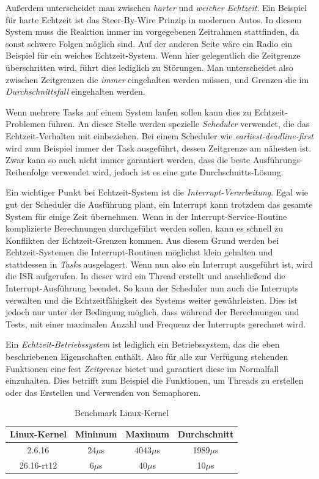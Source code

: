 \documentclass[
  a4paper,					%
  twoside,
  DIV=calc,     				%
  bibliography=totoc,
  cleardoublepage=empty,
  ngerman,     					%
  final       					%
]{scrbook}
\begin{document}
Außerdem unterscheidet man zwischen \emph{harter} und \emph{weicher Echtzeit}. Ein Beispiel für harte Echtzeit ist das Steer-By-Wire Prinzip in modernen Autos. In diesem System muss die Reaktion immer im vorgegebenen Zeitrahmen stattfinden, da sonst schwere Folgen möglich sind. Auf der anderen Seite wäre ein Radio ein Beispiel für ein weiches Echtzeit-System. Wenn hier gelegentlich die Zeitgrenze überschritten wird, führt dies lediglich zu Störungen. Man unterscheidet also zwischen Zeitgrenzen die \emph{immer} eingehalten werden müssen, und Grenzen die im \emph{Durchschnittsfall} eingehalten werden.

Wenn mehrere Tasks auf einem System laufen sollen kann dies zu Echtzeit-Problemen führen. An dieser Stelle werden spezielle \emph{Scheduler} verwendet, die das Echtzeit-Verhalten mit einbeziehen. Bei einem Scheduler wie \emph{earliest-deadline-first} wird zum Beispiel immer der Task ausgeführt, dessen Zeitgrenze am nähesten ist. Zwar kann so auch nicht immer garantiert werden, dass die beste Ausführungs-Reihenfolge verwendet wird, jedoch ist es eine gute Durchschnitts-Lösung.

Ein wichtiger Punkt bei Echtzeit-System ist die \emph{Interrupt-Verarbeitung}. Egal wie gut der Scheduler die Ausführung plant, ein Interrupt kann trotzdem das gesamte System für einige Zeit übernehmen. Wenn in der Interrupt-Service-Routine komplizierte Berechnungen durchgeführt werden sollen, kann es schnell zu Konflikten der Echtzeit-Grenzen kommen. Aus diesem Grund werden bei Echtzeit-Systemen die Interrupt-Routinen möglichst klein gehalten und stattdessen in \emph{Tasks} ausgelagert. Wenn nun also ein Interrupt ausgeführt ist, wird die ISR aufgerufen. In dieser wird ein Thread erstellt und anschließend die Interrupt-Ausführung beendet. So kann der Scheduler nun auch die Interrupts verwalten und die Echtzeitfähigkeit des Systems weiter gewährleisten. Dies ist jedoch nur unter der Bedingung möglich, dass während der Berechnungen und Tests, mit einer maximalen Anzahl und Frequenz der Interrupts gerechnet wird.

Ein \emph{Echtzeit-Betriebssystem} ist lediglich ein Betriebssystem, das die eben beschriebenen Eigenschaften enthält. Also für alle zur Verfügung stehenden Funktionen eine fest \emph{Zeitgrenze} bietet und garantiert diese im Normalfall einzuhalten. Dies betrifft zum Beispiel die Funktionen, um Threads zu erstellen oder das Erstellen und Verwenden von Semaphoren.

\begin{table}[h]
\caption{Benchmark Linux-Kernel}
\begin{tabular}{|c|c|c|c|}
  \hline
  Linux-Kernel & Minimum & Maximum & Durchschnitt\\
  \hline
  2.6.16 & 24$\mu$s & 4043$\mu$s & 1989$\mu$s\\
  26.16-rt12 & 6$\mu$s & 40$\mu$s & 10$\mu$s\\
  \hline
\end{tabular}
\label{tab:benchmark}
\end{table}
\end{document}
